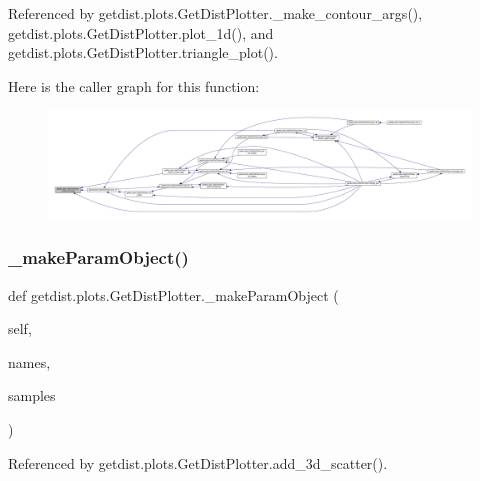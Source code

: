 Referenced by getdist.\+plots.\+Get\+Dist\+Plotter.\+\_\+make\+\_\+contour\+\_\+args(), getdist.\+plots.\+Get\+Dist\+Plotter.\+plot\+\_\+1d(), and getdist.\+plots.\+Get\+Dist\+Plotter.\+triangle\+\_\+plot().

Here is the caller graph for this function\+:
\nopagebreak
\begin{figure}[H]
\begin{center}
\leavevmode
\includegraphics[width=350pt]{classgetdist_1_1plots_1_1GetDistPlotter_a7a9e50f1885013fa6dbe70242e1f8fa3_icgraph}
\end{center}
\end{figure}
\mbox{\label{classgetdist_1_1plots_1_1GetDistPlotter_a1f1a9291eabe11286d6687a482558397}} 
\subsubsection{\texorpdfstring{\+\_\+make\+Param\+Object()}{\_makeParamObject()}}
{\footnotesize\ttfamily def getdist.\+plots.\+Get\+Dist\+Plotter.\+\_\+make\+Param\+Object (\begin{DoxyParamCaption}\item[{}]{self,  }\item[{}]{names,  }\item[{}]{samples }\end{DoxyParamCaption})\hspace{0.3cm}{\ttfamily [private]}}



Referenced by getdist.\+plots.\+Get\+Dist\+Plotter.\+add\+\_\+3d\+\_\+scatter().

